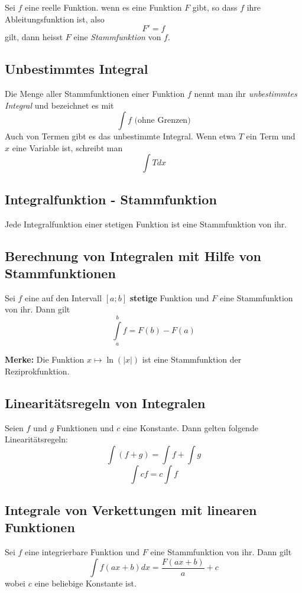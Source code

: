 \documentclass[10pt,a4paper]{scrartcl}
\begin{document}
Sei $f$ eine reelle Funktion. wenn es eine Funktion $F$ gibt, so dass $f$
ihre Ableitungsfunktion ist, also
$$F' = f$$
gilt, dann heisst $F$ eine \textit{Stammfunktion} von $f$.


\subsection{Unbestimmtes Integral}

Die Menge aller Stammfunktionen einer Funktion $f$ nennt man ihr \textit{unbestimmtes Integral} und bezeichnet es mit
$$\int f \textrm{ (ohne Grenzen)}$$
Auch von Termen gibt es das unbestimmte Integral. Wenn etwa $T$ ein Term und $x$ eine Variable ist, schreibt man
$$\int Tdx$$


\subsection{Integralfunktion - Stammfunktion}

Jede Integralfunktion einer stetigen Funktion ist eine Stammfunktion von ihr.


\subsection{Berechnung von Integralen mit Hilfe von Stammfunktionen}

Sei $f$ eine auf den Intervall $[a;b]$ \textbf{stetige} Funktion und $F$ eine Stammfunktion von ihr. Dann gilt
$$\int\limits_a^b f = F(b) - F(a)$$

\textbf{Merke:} Die Funktion $x \mapsto \ln(|x|)$ ist eine Stammfunktion der Reziprokfunktion.


\subsection{Linearitätsregeln von Integralen}

Seien $f$ und $g$ Funktionen und $c$ eine Konstante. Dann gelten folgende Linearitätsregeln:
$$\int (f+g) = \int f + \int g$$
$$\int cf = c \int f$$


\subsection{Integrale von Verkettungen mit linearen Funktionen}
Sei $f$ eine integrierbare Funktion und $F$ eine Stammfunktion von ihr. Dann gilt
$$\int f(ax+b)dx = \frac{F(ax+b)}{a} + c$$
wobei $c$ eine beliebige Konstante ist.
\end{document}
